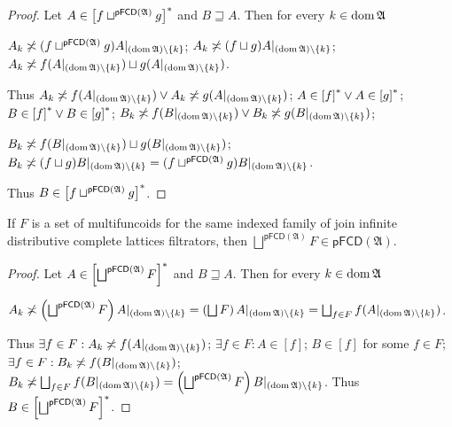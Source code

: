 \begin{proof}
Let $A\in\mathord{\mathrel{\left[f\sqcup^{\mathsf{pFCD}(\mathfrak{A})}g\right]^{\ast}}}$
and $B\sqsupseteq A$. Then for every $k\in\operatorname{dom}\mathfrak{A}$

$A_{k}\not\asymp(f\sqcup^{\mathsf{pFCD}(\mathfrak{A})}g)A|_{(\operatorname{dom}\mathfrak{A})\setminus\{k\}}$;
$A_{k}\not\asymp(f\sqcup g)A|_{(\operatorname{dom}\mathfrak{A})\setminus\{k\}}$; $A_{k}\not\asymp f(A|_{(\operatorname{dom}\mathfrak{A})\setminus\{k\}})\sqcup g(A|_{(\operatorname{dom}\mathfrak{A})\setminus\{k\}})$.

Thus $A_{k}\not\asymp f(A|_{(\operatorname{dom}\mathfrak{A})\setminus\{k\}})\lor A_{k}\not\asymp g(A|_{(\operatorname{dom}\mathfrak{A})\setminus\{k\}})$;
$A\in\mathord{\mathrel{\left[f\right]^{\ast}}}\lor A\in\mathord{\mathrel{\left[g\right]^{\ast}}}$; $B\in\mathord{\mathrel{\left[f\right]^{\ast}}}\lor B\in\mathord{\mathrel{\left[g\right]^{\ast}}}$;
$B_{k}\not\asymp f(B|_{(\operatorname{dom}\mathfrak{A})\setminus\{k\}})\lor B_{k}\not\asymp g(B|_{(\operatorname{dom}\mathfrak{A})\setminus\{k\}})$;

$B_{k}\not\asymp f(B|_{(\operatorname{dom}\mathfrak{A})\setminus\{k\}})\sqcup g(B|_{(\operatorname{dom}\mathfrak{A})\setminus\{k\}})$;
$B_{k}\not\asymp(f\sqcup g)B|_{(\operatorname{dom}\mathfrak{A})\setminus\{k\}}=(f\sqcup^{\mathsf{pFCD}(\mathfrak{A})}g)B|_{(\operatorname{dom}\mathfrak{A})\setminus\{k\}}$.

Thus $B\in\mathord{\mathrel{\left[f\sqcup^{\mathsf{pFCD}(\mathfrak{A})}g\right]^{\ast}}}$.\end{proof}
\begin{thm}
If $F$ is a set of multifuncoids for the same indexed family of join
infinite distributive complete lattices filtrators, then $\bigsqcup^{\mathsf{pFCD}(\mathfrak{A})}F\in\mathsf{pFCD}(\mathfrak{A})$.\end{thm}
\begin{proof}
Let $A\in\mathord{\mathrel{\left[\bigsqcup^{\mathsf{pFCD}(\mathfrak{A})}F\right]^{\ast}}}$
and $B\sqsupseteq A$. Then for every $k\in\operatorname{dom}\mathfrak{A}$

$A_{k}\not\asymp\left(\bigsqcup^{\mathsf{pFCD}(\mathfrak{A})}F\right)A|_{(\operatorname{dom}\mathfrak{A})\setminus\{k\}}=\left(\bigsqcup F\right)A|_{(\operatorname{dom}\mathfrak{A})\setminus\{k\}}=\bigsqcup_{f\in F}f(A|_{(\operatorname{dom}\mathfrak{A})\setminus\{k\}})$.

Thus $\exists f\in F:A_{k}\not\asymp f(A|_{(\operatorname{dom}\mathfrak{A})\setminus\{k\}})$;
$\exists f\in F:A\in\mathord{[f]}$; $B\in\mathord{[f]}$ for some
$f\in F$; $\exists f\in F:B_{k}\not\asymp f(B|_{(\operatorname{dom}\mathfrak{A})\setminus\{k\}})$;
$B_{k}\not\asymp\bigsqcup_{f\in F}f(B|_{(\operatorname{dom}\mathfrak{A})\setminus\{k\}})=\left(\bigsqcup^{\mathsf{pFCD}(\mathfrak{A})}F\right)B|_{(\operatorname{dom}\mathfrak{A})\setminus\{k\}}$.
Thus $B\in\mathord{\mathrel{\left[\bigsqcup^{\mathsf{pFCD}(\mathfrak{A})}F\right]^{\ast}}}$.
\end{proof}

